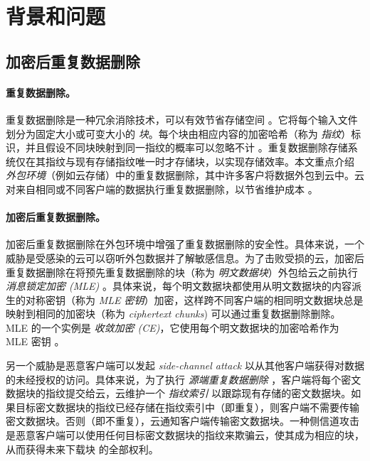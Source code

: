 \section{背景和问题}
\label{sec:featurespy-background}

\subsection{加密后重复数据删除}
\label{subsec:featurespy-basics}

\paragraph*{重复数据删除。}
重复数据删除是一种冗余消除技术，可以有效节省存储空间 \cite{wallace12, meyer11}。它将每个输入文件划分为固定大小或可变大小的 {\em 块}。每个块由相应内容的加密哈希（称为 {\em 指纹}）标识，并且假设不同块映射到同一指纹的概率可以忽略不计 \cite{black2006compare}。重复数据删除存储系统仅在其指纹与现有存储指纹唯一时才存储块，以实现存储效率。本文重点介绍 {\em 外包环境}（例如云存储）中的重复数据删除，其中许多客户将数据外包到云中。云对来自相同或不同客户端的数据执行重复数据删除，以节省维护成本 \cite{harnik10}。


\paragraph*{加密后重复数据删除。}
加密后重复数据删除在外包环境中增强了重复数据删除的安全性。具体来说，一个威胁是受感染的云可以窃听外包数据并了解敏感信息。为了击败受损的云，加密后重复数据删除在将预先重复数据删除的块（称为 {\em 明文数据块}）外包给云之前执行 {\em 消息锁定加密 (MLE)} \cite{bellare2013MLE, bellare2013DupLESS}。具体来说，每个明文数据块都使用从明文数据块的内容派生的对称密钥（称为 {\em MLE 密钥}）加密，这样跨不同客户端的相同明文数据块总是映射到相同的加密块（称为 {\em ciphertext chunks}) 可以通过重复数据删除删除。 MLE 的一个实例是 {\em 收敛加密 (CE)}，它使用每个明文数据块的加密哈希作为 MLE 密钥 \cite{douceur02}。

另一个威胁是恶意客户端可以发起 {\em side-channel attack} \cite{harnik10, halevi11} 以从其他客户端获得对数据的未经授权的访问。具体来说，为了执行 {\em 源端重复数据删除} \cite{harnik10}，客户端将每个密文数据块的指纹提交给云，云维护一个 {\em 指纹索引} 以跟踪现有存储的密文数据块。如果目标密文数据块的指纹已经存储在指纹索引中（即重复），则客户端不需要传输密文数据块。否则（即不重复），云通知客户端传输密文数据块。一种侧信道攻击 \cite{mulazzani11, halevi11} 是恶意客户端可以使用任何目标密文数据块的指纹来欺骗云，使其成为相应的块，从而获得未来下载块 \cite{mulazzani11} 的全部权利。


